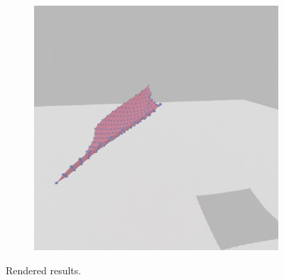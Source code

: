 \documentclass[conference]{IEEEtran}
\begin{document}
\begin{figure}[htbp]
\begin{subfigure}[b]{0.15\textwidth}
    \end{subfigure}
    \hfill %
    \begin{subfigure}[b]{0.15\textwidth}
        \centering
        \includegraphics[width=\textwidth]{images/hw0/step_0036.png}
    \end{subfigure}
    \caption{Rendered results.}
    \label{fig:results_frames}
\end{figure}





\end{document}
